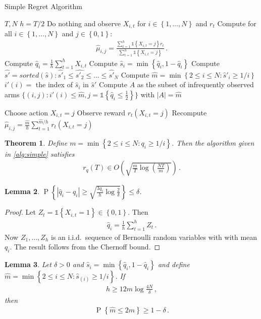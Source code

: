 \documentclass{article}
\newcommand{\set}[1]{\left\{#1\right\}}
\newcommand{\ind}[1]{\mathds{1}\!\!\set{#1}}
\newcommand{\eq}[1]{\begin{align*}#1\end{align*}}
\renewcommand{\P}[1]{\operatorname{P}\left\{#1\right\}}
\theoremstyle{plain}
\newtheorem{theorem}{Theorem}
\newtheorem{lemma}[theorem]{Lemma}
\theoremstyle{definition}
\begin{document}
\begin{algorithm}[H]
\caption{Simple Regret Algorithm}\label{alg:simple}
\begin{algorithmic}[1]
 $T, N$
\State $h = T/2$
\State Do nothing and observe $X_{i,t}$ for $i \in \set{1,\ldots,N}$ and $r_t$
\EndFor
\State Compute for all $i \in \set{1,\ldots,N}$ and $j \in \set{0,1}$:
\eq{
\hat \mu_{i,j} = \frac{\sum_{t=1}^h \ind{X_{i,t} = j} r_t}{\sum_{t=1}^h \ind{X_{i,t} = j}}\,.
}
\State Compute $\hat q_i = \frac{1}{h} \sum_{t=1}^h X_{i,t}$
\State Compute $\hat s_i = \min\set{\hat q_i, 1 - \hat q_i}$
\State Compute $\hat{s'} = sorted(\hat{s}) : \hat{s'}_1 \leq \hat{s'_2} \leq ... \leq \hat{s'}_N$
\State Compute $\hat m = \min\set{2 \leq i \leq N : \hat s'_{i} \geq 1/i}$
\State $i'(i) = $ the index of $\hat s_i$ in $\hat s'$
\State Compute $A$ as the subset of infrequently observed arms $\{(i,j):i'(i) \leq \hat m, j = \ind{\hat q_{i} \leq \frac{1}{2}} \}$ with $|A| = \hat m$

\State Choose action $X_{i,t} = j$
\State Observe reward $r_t(X_{i,t}=j)$
\EndFor
\State Recompute $\hat \mu_{i,j} = \frac{\hat m}{h} \sum_{t=1}^{\hat m/h} r_t(X_{i,t}=j)$ 
\EndFor
\end{algorithmic}
\end{algorithm}

\begin{theorem}\label{thm:simple-regret}
Define $m = \min\set{2 \leq i \leq N : q_i \geq 1/i}$.
Then the algorithm given in \cref{alg:simple} satisfies
\eq{
r_q(T) \in O\left(\sqrt{\frac{m}{T} \log \left(\frac{NT}{m}\right)}\right)\,.
}
\end{theorem}

\begin{lemma}\label{lem:conc1}
$\displaystyle \P{\left|\hat q_i - q_i\right| \geq \sqrt{\frac{3q_i}{h} \log \frac{2}{\delta}}} \leq \delta$.
\end{lemma}

\begin{proof}
Let $Z_t = \ind{X_{i,t} = 1} \in \set{0,1}$.
Then
\eq{
\hat q_i = \frac{1}{h} \sum_{t=1}^{h} Z_t\,.
}
Now $Z_1,\ldots,Z_h$ is an i.i.d.\ sequence of Bernoulli random variables with with mean $q_i$. The result follows from the Chernoff bound.
\end{proof}

\begin{lemma}\label{lem:conc2}
Let $\delta >0$ and $\hat s_i = \min\set{\hat q_i, 1 - \hat q_i}$ and
define $\hat m = \min\set{2 \leq i \leq N : \hat s_{(i)} \geq 1/i}$.
If
\eq{
h \geq 12m \log\frac{4N}{\delta}\,,
}
then
\eq{
\P{\hat m \leq 2m} \geq 1 - \delta\,.
}
\end{lemma}
\end{document}
